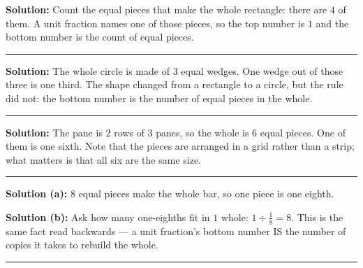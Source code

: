 \documentclass[12pt]{article}
\begin{document}



\textbf{Solution:} Count the equal pieces that make the whole rectangle: there are $4$ of them.
A unit fraction names one of those pieces, so the top number is $1$ and the bottom number is the
count of equal pieces. 

\vspace{0.15cm}\noindent\rule{\linewidth}{0.2pt}


\textbf{Solution:} The whole circle is made of $3$ equal wedges. One wedge out of those three is
one third. The shape changed from a rectangle to a circle, but the rule did not: the bottom number
is the number of equal pieces in the whole. 

\vspace{0.15cm}\noindent\rule{\linewidth}{0.2pt}


\textbf{Solution:} The pane is $2$ rows of $3$ panes, so the whole is $6$ equal pieces. One of them
is one sixth. Note that the pieces are arranged in a grid rather than a strip; what matters is that
all six are the same size. 

\vspace{0.15cm}\noindent\rule{\linewidth}{0.2pt}


\textbf{Solution (a):} $8$ equal pieces make the whole bar, so one piece is one eighth. 

\textbf{Solution (b):} Ask how many one-eighths fit in $1$ whole: $1 \div \frac{1}{8} = 8$. This is
the same fact read backwards --- a unit fraction's bottom number IS the number of copies it takes to
rebuild the whole. 

\vspace{0.15cm}\noindent\rule{\linewidth}{0.2pt}

\end{document}

